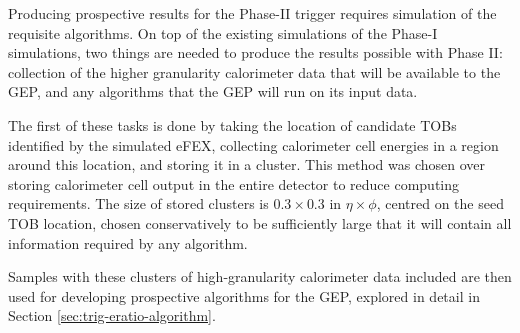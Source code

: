 
Producing prospective results for the Phase-II trigger requires simulation of
the requisite algorithms. On top of the existing simulations of the Phase-I
simulations, two things are needed to produce the results possible with Phase
II: collection of the higher granularity calorimeter data that will be available
to the \ac{GEP}, and any algorithms that the \ac{GEP} will run on its input
data.

The first of these tasks is done by taking the location of \egamma candidate
\ac{TOB}s identified by the simulated \ac{eFEX}, collecting calorimeter cell
energies in a region around this location, and storing it in a cluster. This
method was chosen over storing calorimeter cell output in the entire detector to
reduce computing requirements. The size of stored clusters is $0.3\times0.3$ in
$\eta\times\phi$, centred on the seed \ac{TOB} location, chosen conservatively
to be sufficiently large that it will contain all information required by any
algorithm.

Samples with these clusters of high-granularity calorimeter data included are
then used for developing prospective algorithms for the \ac{GEP}, explored in
detail in Section \ref{sec:trig-eratio-algorithm}.
